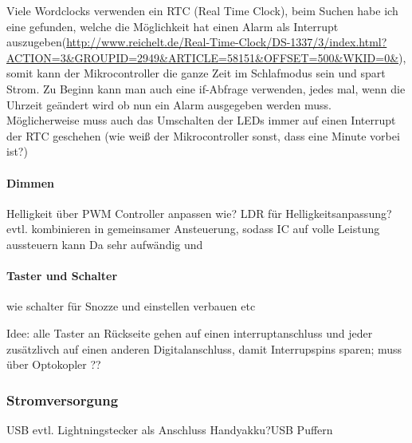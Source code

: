 \documentclass[11pt,a4paper,ngerman]{article}
\begin{document}
Viele Wordclocks verwenden ein RTC (Real Time Clock), beim Suchen habe ich eine gefunden, welche die Möglichkeit hat einen Alarm als Interrupt auszugeben(\url{http://www.reichelt.de/Real-Time-Clock/DS-1337/3/index.html?ACTION=3&GROUPID=2949&ARTICLE=58151&OFFSET=500&WKID=0&}), somit kann der Mikrocontroller die ganze Zeit im Schlafmodus sein und spart Strom. Zu Beginn kann man auch eine if-Abfrage verwenden, jedes mal, wenn die Uhrzeit geändert wird ob nun ein Alarm ausgegeben werden muss. Möglicherweise muss auch das Umschalten der LEDs immer auf einen Interrupt der RTC geschehen (wie weiß der Mikrocontroller sonst, dass eine Minute vorbei ist?)


\paragraph{Dimmen}
Helligkeit über PWM Controller anpassen wie?
LDR für Helligkeitsanpassung? evtl. kombinieren in gemeinsamer Ansteuerung, sodass IC auf volle Leistung aussteuern kann
Da sehr aufwändig und
\paragraph{Taster und Schalter}

wie schalter für Snozze und einstellen verbauen etc

Idee: alle Taster an Rückseite gehen auf einen interruptanschluss und jeder zusätzlivch auf einen anderen Digitalanschluss, damit Interrupspins sparen; muss über Optokopler ??
\subsubsection{Stromversorgung}
USB evtl. Lightningstecker als Anschluss       
Handyakku?USB Puffern\cite{RTCDatenblatt}


\end{document}
